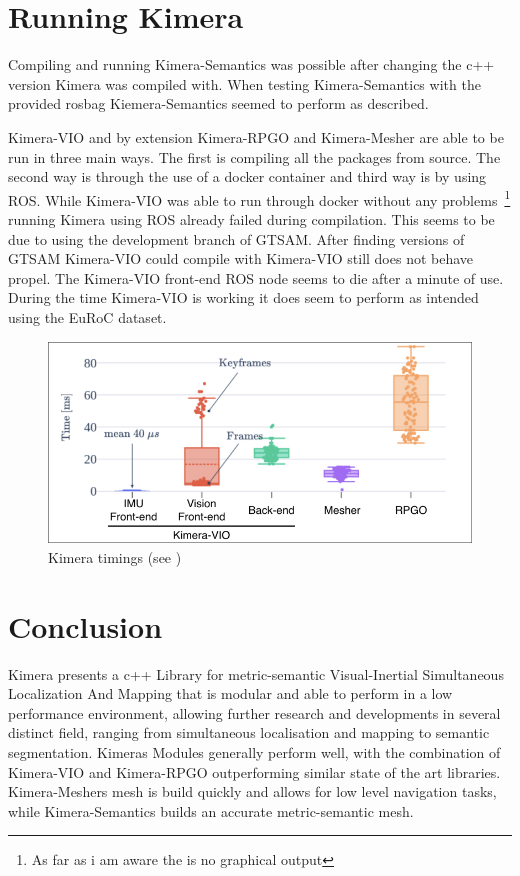 \documentclass[11pt,a4paper]{article}
\begin{document}
\section{Running Kimera}
Compiling and running Kimera-Semantics was possible after changing the c++ version Kimera was compiled with.
When testing Kimera-Semantics with the provided rosbag Kiemera-Semantics seemed to perform as described.

Kimera-VIO and by extension Kimera-RPGO and Kimera-Mesher are able to be run in three main ways. 
The first is compiling all the packages from source. 
The second way is through the use of a docker container and third way is by using ROS.
While Kimera-VIO was able to run through docker without any problems~\footnote{As far as i am aware the is no graphical output} running Kimera using ROS already failed during compilation. 
This seems to be due to using the development branch of GTSAM. 
After finding versions of GTSAM Kimera-VIO could compile with Kimera-VIO still does not behave propel. 
The Kimera-VIO front-end ROS node seems to die after a minute of use.
During the time Kimera-VIO is working it does seem to perform as intended using the EuRoC dataset.
\begin{figure}
  \centering
  \includegraphics[width=120mm]{Timings}
  \caption{Kimera timings (see \cite{rosinol2020kimera})}\label{Fig:Timings}  
\end{figure}

\section{Conclusion}
Kimera presents a c++ Library for metric-semantic Visual-Inertial Simultaneous Localization And Mapping that is modular and able to perform in a low performance environment, allowing further research and developments in several distinct field, ranging from simultaneous localisation and mapping to semantic segmentation.
Kimeras Modules generally perform well, with the combination of Kimera-VIO and Kimera-RPGO outperforming similar state of the art libraries.
Kimera-Meshers mesh is build quickly and allows for low level navigation tasks, while Kimera-Semantics builds an accurate metric-semantic mesh.


{\small                   %

}
\end{document}
